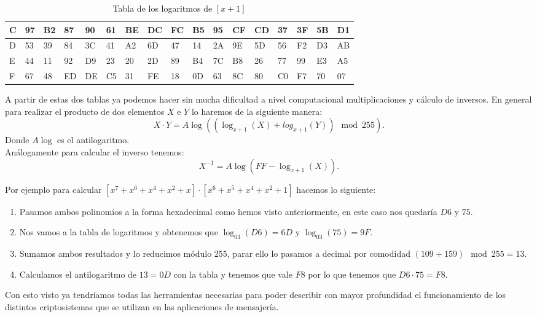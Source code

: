 \begin{table}[!htb]
{\begin{tabular}{|l|l|l|l|l|l|l|l|l|l|l|l|l|l|l|l|l|}
C & 97 & B2 & 87 & 90 & 61 & BE & DC & FC & B5 & 95 & CF & CD & 37 & 3F & 5B & D1 \\ \hline
D & 53 & 39 & 84 & 3C & 41 & A2 & 6D & 47 & 14 & 2A & 9E & 5D & 56 & F2 & D3 & AB \\ \hline
E & 44 & 11 & 92 & D9 & 23 & 20 & 2D & 89 & B4 & 7C & B8 & 26 & 77 & 99 & E3 & A5 \\ \hline
F & 67 & 48 & ED & DE & C5 & 31 & FE & 18 & 0D & 63 & 8C & 80 & C0 & F7 & 70 & 07 \\ \hline
\end{tabular}}
	\label{potenciasinversas}
\caption{Tabla de los logaritmos de $[x+1]$}
\end{table}

A partir de estas dos tablas ya podemos hacer sin mucha dificultad a nivel computacional multiplicaciones y cálculo de inversos. En general para realizar el producto de dos elementos $X$ e $Y$ lo haremos de la siguiente manera:
$$
	X\cdot Y = A\log((\log_{x+1}(X)+log_{x+1}(Y)) \mod 255).
$$
Donde $A\log$ es el antilogaritmo.\\
Análogamente para calcular el inverso tenemos:
$$
	X^{-1} = A\log(FF-\log_{x+1}(X)).
$$

Por ejemplo para calcular $[x^7+x^6+x^4+x^2+x]\cdot[x^6+x^5+x^4+x^2+1]$ hacemos lo siguiente:
\begin{enumerate}
	\item Pasamos ambos polinomios a la forma hexadecimal como hemos visto anteriormente, en este caso nos quedaría $D6$ y $75$.
	\item Nos vamos a la tabla de logaritmos y obtenemos que $\log_{03}(D6)=6D$ y $\log_{03}(75)=9F$.
	\item Sumamos ambos resultados y lo reducimos módulo $255$, parar ello lo pasamos a decimal por comodidad $(109+159)\mod255=13$.
	\item Calculamos el antilogaritmo de $13=0D$ con la tabla y tenemos que vale $F8$ por lo que tenemos que $D6\cdot 75 = F8$.
\end{enumerate}

Con esto visto ya tendríamos todas las herramientas necesarias para poder describir con mayor profundidad el funcionamiento de los distintos criptosistemas que se utilizan en las aplicaciones de mensajería.

